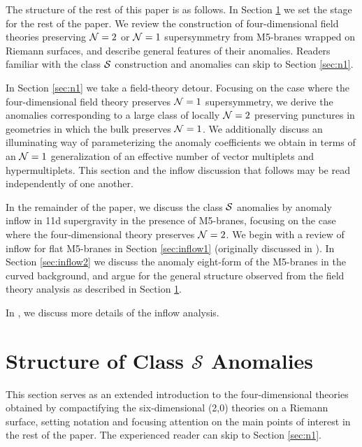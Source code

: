 \documentclass[a4paper,11pt]{article}
\def\CN{{\cal N}}
\def\CS{{\cal S}}
\begin{document}
The structure of the rest of this paper is as follows. In Section \ref{sec:classS} we set the stage for the rest of the paper. We review the construction of four-dimensional field theories preserving $\CN=2$ or $\CN=1$ supersymmetry from M5-branes wrapped on Riemann surfaces, and describe general features of their anomalies. Readers familiar with the class $\CS$ construction and anomalies can skip to Section \ref{sec:n1}. 

In Section \ref{sec:n1} we take a field-theory detour. Focusing on the case where the four-dimensional field theory preserves $\CN=1$ supersymmetry, we derive the anomalies corresponding to a large class of locally $\CN=2$ preserving punctures in geometries in which the bulk preserves $\CN=1$. We additionally discuss an illuminating way of parameterizing the anomaly coefficients we obtain in terms of an $\CN=1$ generalization of an effective number of vector multiplets and hypermultiplets. This section and the inflow discussion that follows may be read independently of one another. 

In the remainder of the paper, we discuss the class $\CS$ anomalies by anomaly inflow in 11d supergravity in the presence of M5-branes, focusing on the case where the four-dimensional theory preserves $\CN=2$. We begin with a review of inflow for flat M5-branes in Section \ref{sec:inflow1} (originally discussed in \cite{Freed:1998tg,Harvey:1998bx,Witten:1996hc}). In Section \ref{sec:inflow2} we discuss the anomaly eight-form of the M5-branes in the curved background, and argue for the general structure observed from the field theory analysis as described in Section \ref{sec:classS}.



In \cite{Bah:2018bn}, we discuss more details of the inflow analysis.  





\section{Structure of Class $\mathcal{S}$ Anomalies} \label{sec:classS}

This section serves as an extended introduction to the four-dimensional theories obtained by compactifying the six-dimensional (2,0) theories on a Riemann surface, setting notation and focusing attention on the main points of interest in the rest of the paper. The experienced reader can skip to Section \ref{sec:n1}.
\end{document}
